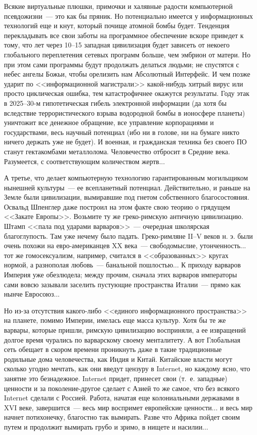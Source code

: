 \documentclass{scrbook}
\newcommand{\flqq}{<<}
\newcommand{\frqq}{>>}
\newcommand{\mdash}{~--- }
\newcommand{\ndash}{--}
\begin{document}
Всякие виртуальные плюшки, примочки и халявные радости компьютерной псевдожизни{\mdash}это как бы пряник. Но потенциально имеется у информационных технологий еще и кнут, который почище атомной бомбы будет. Тенденция перекладывать все свои заботы на программное обеспечение вскоре приведет к тому, что лет через 10{\ndash}15 западная цивилизация будет зависеть от некоего глобального переплетения сетевых программ больше, чем эмбрион от матери. Но при этом сами программы будут продолжать делаться людьми; не спустятся с небес ангелы Божьи, чтобы орелизить нам Абсолютный Интерфейс. И чем позже ударит по {\flqq}информационной магистрали{\frqq} какой-нибудь хитрый вирус или просто циклическая ошибка, тем катастрофичнее окажутся результаты. Году этак в 2025{\ndash}30-м гипотетическая гибель электронной информации (да хотя бы вследствие террористического взрыва водородной бомбы в ионосфере планеты) уничтожит все денежное обращение, все управление корпорациями и государствами, весь научный потенциал (ибо ни в голове, ни на бумаге никто ничего держать уже не будет). И военная, и гражданская техника без своего ПО станут гектакомбами металлолома. Человечество отбросит в Средние века. Разумеется, с соответствующим количеством жертв...

А третье, что делает компьютерную технологию гарантированным могильщиком нынешней культуры{\mdash}ее всепланетный потенциал. Действительно, и раньше на Земле были цивилизации, вымиравшие под гнетом собственного благосостояния. Освальд Шпенглер даже построил на этом факте свою теорию о грядущем {\flqq}Закате Европы{\frqq}. Возьмите ту же греко-римскую античную цивилизацию. Штамп {\flqq}пала под ударами варваров{\frqq}{\mdash}очередная школярская благоглупость. Там уже нечему было падать. Греко-римляне II{\ndash}V веков н. э. были очень похожи на евро-американцев XX века{\mdash}свободомыслие, утонченность... тот же гомосексуализм, например, считался в {\flqq}образованных{\frqq} кругах нормой, а разнополая любовь{\mdash}банальной пошлостью... К приходу варваров Империя уже обезлюдела; между прочим, сначала этих варваров императоры сами вовсю зазывали заселить пустующие пространства Италии{\mdash}прямо как нынче Евросоюз...

Но из-за отсутствия какого-либо {\flqq}единого информационного пространства{\frqq} на планете, помимо Империи, имелась еще масса культур. Хотя бы те же варвары, которые пришли, римскую цивилизацию восприняли, а ее извращений долгое время чурались по варварскому своему менталитету. А вот Глобальная сеть обещает в скором времени проникнуть даже в такие традиционные родильные дома человечества, как Индия и Китай. Китайские власти могут сколько угодно мечтать, как они введут цензуру в Internet, но каждому ясно, что занятие это безнадежное. Internet придет, принесет свои (т.~е. западные) ценности и за поколение-другое сделает с Азией то же самое, что без всякого Internet сделали с Россией. Работа, начатая еще колониальными державами в XVI веке, завершится{\mdash}весь мир воспримет европейские ценности... и весь мир начнет потихонечку, благостно так вымирать. Разве что Африка пойдет своим путем и продолжит вымирать грубо и зримо, в нищете и насилии...
\end{document}
